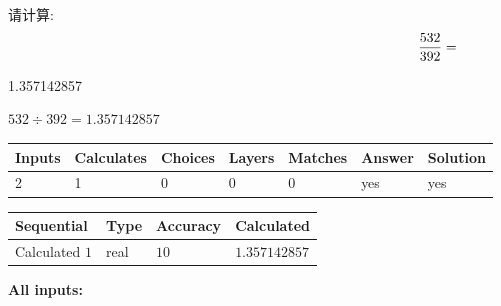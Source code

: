\documentclass{ctexart}
\begin{document}
  
 
请计算:
\begin{equation}
\frac { %
532 }  {  %
392} = \nonumber
\end{equation}
 
 
 
\noindent{}
 
 

1.357142857
 
 
\noindent{}
 
 

 
 
 
\noindent{}
 
 

$ %
532 \div  %
392=   %
1.357142857$
 
 
\noindent{}
 
 

 
   
   
   
   
\noindent\begin{tabular}{|l|l|l|l|l|l|l|}
 \hline
Inputs & Calculates & Choices & Layers & Matches & Answer & Solution \\ \hline
 2  & 
 1  & 
 0
  & 
 0  & 
 0  & 
  yes & 
  yes 
  \\ \hline
 \end{tabular}
   
   
   
   
\noindent{}
   
   
  
  
\noindent\begin{tabular}{|l|l|l|l|}
\hline
 Sequential & Type & Accuracy & Calculated \\ 
\hline
 
 
  Calculated $  1 $ & real & $  10  $ & 
 $ 1.357142857 $ 
 \\  \hline  
 \end{tabular}
   
   
   
   
\noindent\vspace{0.1in}\hspace{-0.08in} {\textbf{\Large{All inputs: }}}
   
\end{document}
